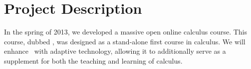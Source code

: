 \section{Project Description}



In the spring of 2013, we developed a massive open online calculus
course. This course, dubbed \mooculus, was designed as a stand-alone
first course in calculus.  We will enhance \mooculus\ with adaptive
technology, allowing it to additionally serve as a supplement for both
the teaching and learning of calculus.

